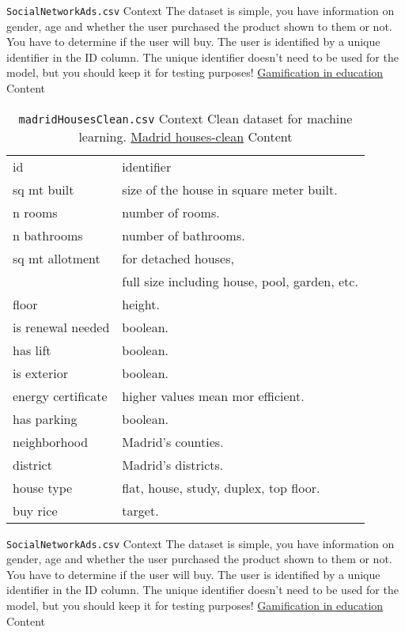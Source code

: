 \documentclass[12pt]{article}
\theoremstyle{remark}
\begin{document}
\begin{table}
	\caption{ \texttt{SocialNetworkAds.csv}
Context
The dataset is simple, you have information on gender, age and whether the user purchased the product shown to them or not. You have to determine if the user will buy. The user is identified by a unique identifier in the ID column. The unique identifier doesn't need to be used for the model, but you should keep it for testing purposes!
\href{https://www.kaggle.com/datasets/micheldc55/social-network-ads}{Gamification in education} Content
}

\end{table}



\begin{table}
	\caption{ \texttt{madridHousesClean.csv}
Context
Clean dataset for machine learning.
\href{https://www.kaggle.com/datasets/makofe/housesclean}{Madrid houses-clean} Content
}
	\begin{tabular}{l|l}\hline
id & identifier\\
sq mt built  & size of the house in square meter built.\\
n rooms & number of rooms.\\
n bathrooms & number of bathrooms. \\
sq mt allotment& for detached houses,\\
& full size including house, pool, garden, etc.\\
floor & height.\\
is renewal needed &  boolean.\\
has lift & boolean.\\
is exterior & boolean.\\
energy certificate & higher values mean mor efficient.\\
has parking & boolean.\\
neighborhood & Madrid's counties.\\
district & Madrid's districts.\\
house type & flat, house, study, duplex, top floor.\\
buy rice & target.\\
	\hline
	\end{tabular}
\end{table}


\begin{table}
	\caption{ \texttt{SocialNetworkAds.csv}
Context
The dataset is simple, you have information on gender, age and whether the user purchased the product shown to them or not. You have to determine if the user will buy. The user is identified by a unique identifier in the ID column. The unique identifier doesn't need to be used for the model, but you should keep it for testing purposes!
\href{https://www.kaggle.com/datasets/micheldc55/social-network-ads}{Gamification in education} Content
}

\end{table}
\end{document}
